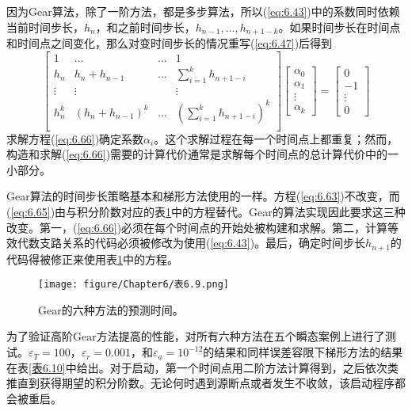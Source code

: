 因为Gear算法，除了一阶方法，都是多步算法，所以(\ref{eq:6.43})中的系数同时依赖当前时间步长，$h_n$，和之前时间步长，$h_{n-1},\dots,h_{n+1-k}$。如果时间步长在时间点和时间点之间变化，那么对变时间步长的情况重写(\ref{eq:6.47})后得到
\begin{equation}
    \begin{bmatrix}
1 &\dots  &\dots  &1  \\
h_n &h_n+h_{n-1}  &\dots  &\sum^k_{i=1}h_{n+1-i}\\
\vdots &\vdots  &  &\vdots  \\
h^k_n &(h_n+h_{n-1})^k  &\dots  &(\sum^k_{i=1}h_{n+1-i})^k  \\
\end{bmatrix}\begin{bmatrix}
\alpha_0 \\
\alpha_1 \\
\vdots \\
\alpha_k
\end{bmatrix} = \begin{bmatrix}
0 \\
-1 \\
\vdots \\
0
\end{bmatrix}
\label{eq:6.66}
\end{equation}
求解方程(\ref{eq:6.66})确定系数$\alpha_i$。这个求解过程在每一个时间点上都重复；然而，构造和求解(\ref{eq:6.66})需要的计算代价通常是求解每个时间点的总计算代价中的一小部分。

Gear算法的时间步长策略基本和梯形方法使用的一样。方程(\ref{eq:6.63})不改变，而(\ref{eq:6.65})由与积分阶数对应的表\ref{表6.9}中的方程替代。Gear的算法实现因此要求这三种改变。第一，(\ref{eq:6.66})必须在每个时间点的开始处被构建和求解。第二，计算等效代数支路关系的代码必须被修改为使用(\ref{eq:6.43})。最后，确定时间步长$h_{n+1}$的代码得被修正来使用表\ref{表6.9}中的方程。

\begin{figure}[htbp]
\small
    \centering
    \texttt{[image: figure/Chapter6/表6.9.png]}
    \caption{Gear的六种方法的预测时间。}
    \label{表6.9}
\end{figure}

为了验证高阶Gear方法提高的性能，对所有六种方法在五个瞬态案例上进行了测试。$\varepsilon_T = 100$，$\varepsilon_r = 0.001$，和$\varepsilon_a = 10^{-12}$的结果和同样误差容限下梯形方法的结果在表\ref{表6.10}中给出。对于启动，第一个时间点用二阶方法计算得到，之后依次类推直到获得期望的积分阶数。无论何时遇到源断点或者发生不收敛，该启动程序都会被重启。

